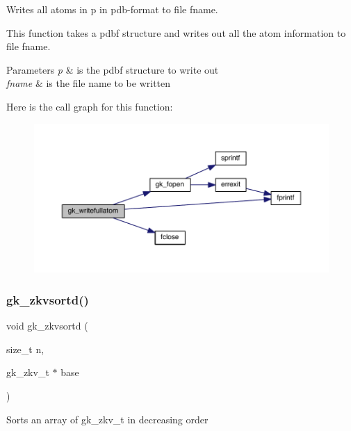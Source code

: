 Writes all atoms in p in pdb-\/format to file fname. 

This function takes a pdbf structure and writes out all the atom information to file fname.


\begin{DoxyParams}{Parameters}
{\em p} & is the pdbf structure to write out \\
\hline
{\em fname} & is the file name to be written \\
\hline
\end{DoxyParams}
Here is the call graph for this function\+:\nopagebreak
\begin{figure}[H]
\begin{center}
\leavevmode
\includegraphics[width=350pt]{a00077_a786192984ea62e6824ae9a2d1b902574_cgraph}
\end{center}
\end{figure}
\mbox{\label{a00077_abc86dfec06dd608e4b6428b09afc9eb7}} 
\subsubsection{\texorpdfstring{gk\+\_\+zkvsortd()}{gk\_zkvsortd()}}
{\footnotesize\ttfamily void gk\+\_\+zkvsortd (\begin{DoxyParamCaption}\item[{size\+\_\+t}]{n,  }\item[{gk\+\_\+zkv\+\_\+t $\ast$}]{base }\end{DoxyParamCaption})}

Sorts an array of gk\+\_\+zkv\+\_\+t in decreasing order \mbox{\label{a00077_a1af9242bde9d9741c040177a7ab0be71}} 
